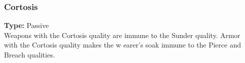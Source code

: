 \subsubsection{Cortosis}
\label{iqty:cortosis}
\textbf{Type:} Passive\\
Weapons with the Cortosis quality are immune to
the Sunder quality. Armor with the Cortosis quality
makes the w earer’s soak immune to the Pierce and
Breach qualities.
